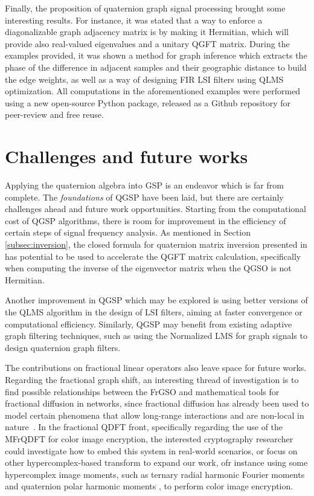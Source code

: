Finally, the proposition of quaternion graph signal processing brought some interesting results. For instance, it was stated that a way to enforce a diagonalizable graph adjacency matrix is by making it Hermitian, which will provide also real-valued eigenvalues and a unitary QGFT matrix. During the examples provided, it was shown a method for graph inference which extracts the phase of the difference in adjacent samples and their geographic distance to build the edge weights, as well as a way of designing FIR LSI filters using QLMS optimization. All computations in the aforementioned examples were performed using a new open-source Python package, released as a Github repository for peer-review and free reuse.

\section{Challenges and future works}

Applying the quaternion algebra into GSP is an endeavor which is far from complete. The \textit{foundations} of QGSP have been laid, but there are certainly challenges ahead and future work opportunities. Starting from the computational cost of QGSP algorithms, there is room for improvement in the efficiency of certain steps of signal frequency analysis. As mentioned in Section \ref{subsec:inversion}, the closed formula for quaternion matrix inversion presented in \cite{cohen1999quaternionic} has potential to be used to accelerate the QGFT matrix calculation, specifically when computing the inverse of the eigenvector matrix when the QGSO is not Hermitian.

Another improvement in QGSP which may be explored is using better versions of the QLMS algorithm \cite{ogunfunmi2015adaptive} in the design of LSI filters, aiming at faster convergence or computational efficiency. Similarly, QGSP may benefit from existing adaptive graph filtering techniques, such as using the Normalized LMS for graph signals \cite{spelta2020normalized} to design quaternion graph filters.

The contributions on fractional linear operators also leave space for future works. Regarding the fractional graph shift, an interesting thread of investigation is to find possible relationships between the FrGSO and mathematical tools for fractional diffusion in networks, since fractional diffusion has already been used to model certain phenomena that allow long-range interactions and are non-local in nature~\cite{ilic2005,riascos2014,estrada2021,antil2021}. In the fractional QDFT front, specifically regarding the use of the MFrQDFT for color image encryption, the interested cryptography researcher could investigate how to embed this system in real-world scenarios, or focus on other hypercomplex-based transform to expand our work, ofr instance using some hypercomplex image moments, such as ternary radial harmonic Fourier moments and quaternion polar harmonic moments \cite{wang2019ternary,wang2018quaternion}, to perform color image encryption.
